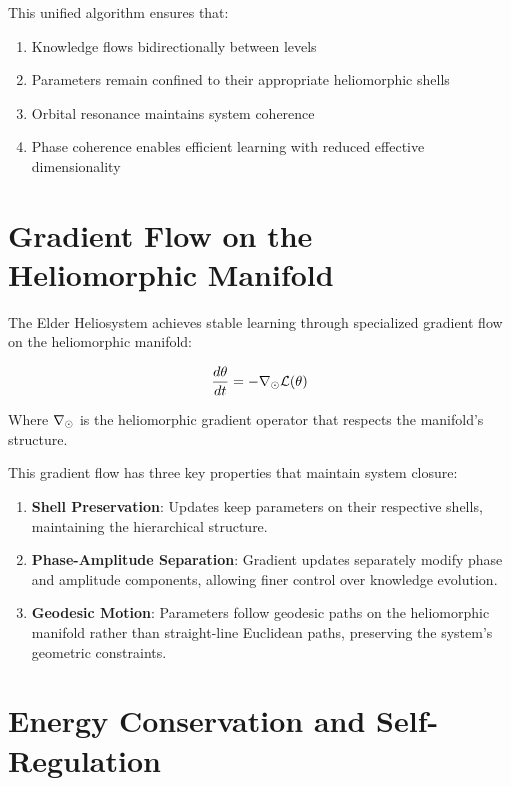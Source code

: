 This unified algorithm ensures that:

\begin{enumerate}
    \item Knowledge flows bidirectionally between levels
    \item Parameters remain confined to their appropriate heliomorphic shells
    \item Orbital resonance maintains system coherence
    \item Phase coherence enables efficient learning with reduced effective dimensionality
\end{enumerate}

\section{Gradient Flow on the Heliomorphic Manifold}

The Elder Heliosystem achieves stable learning through specialized gradient flow on the heliomorphic manifold:

\begin{equation}
\frac{d\theta}{dt} = -\nabla_{\odot} \mathcal{L}(\theta)
\end{equation}

Where $\nabla_{\odot}$ is the heliomorphic gradient operator that respects the manifold's structure.

This gradient flow has three key properties that maintain system closure:

\begin{enumerate}
    \item \textbf{Shell Preservation}: Updates keep parameters on their respective shells, maintaining the hierarchical structure.
    
    \item \textbf{Phase-Amplitude Separation}: Gradient updates separately modify phase and amplitude components, allowing finer control over knowledge evolution.
    
    \item \textbf{Geodesic Motion}: Parameters follow geodesic paths on the heliomorphic manifold rather than straight-line Euclidean paths, preserving the system's geometric constraints.
\end{enumerate}

\section{Energy Conservation and Self-Regulation}

